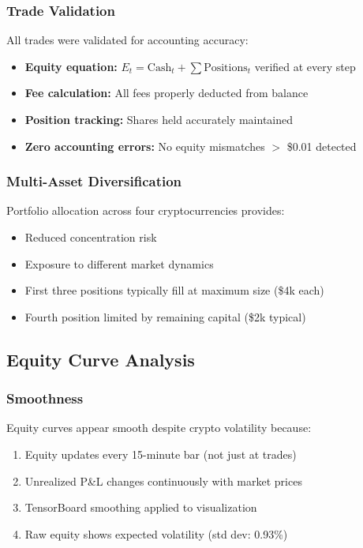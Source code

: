 \documentclass[12pt,a4paper]{article}
\begin{document}
\subsubsection{Trade Validation}
All trades were validated for accounting accuracy:
\begin{itemize}
    \item \textbf{Equity equation:} $E_t = \text{Cash}_t + \sum \text{Positions}_t$ verified at every step
    \item \textbf{Fee calculation:} All fees properly deducted from balance
    \item \textbf{Position tracking:} Shares held accurately maintained
    \item \textbf{Zero accounting errors:} No equity mismatches $>$ \$0.01 detected
\end{itemize}

\subsubsection{Multi-Asset Diversification}
Portfolio allocation across four cryptocurrencies provides:
\begin{itemize}
    \item Reduced concentration risk
    \item Exposure to different market dynamics
    \item First three positions typically fill at maximum size (\$4k each)
    \item Fourth position limited by remaining capital (\$2k typical)
\end{itemize}

\subsection{Equity Curve Analysis}

\subsubsection{Smoothness}
Equity curves appear smooth despite crypto volatility because:
\begin{enumerate}
    \item Equity updates every 15-minute bar (not just at trades)
    \item Unrealized P\&L changes continuously with market prices
    \item TensorBoard smoothing applied to visualization
    \item Raw equity shows expected volatility (std dev: 0.93\%)
\end{enumerate}
\end{document}
